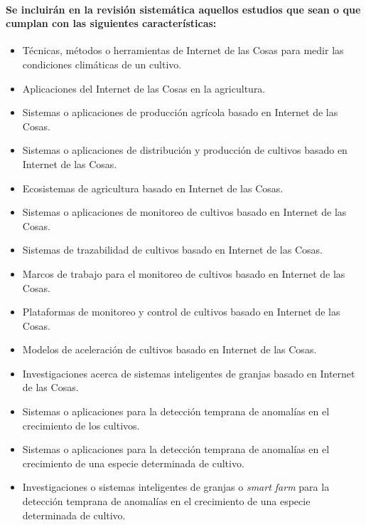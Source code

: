 \documentclass[10pt, twocolumn]{article}
\begin{document}
\paragraph{Se incluirán en la revisión sistemática aquellos estudios que sean o que cumplan con las siguientes características:}
\begin{itemize}
	\item{Técnicas, métodos o herramientas de Internet de las Cosas para medir las condiciones climáticas de un cultivo.}
	\item{Aplicaciones del Internet de las Cosas en la agricultura.}
	\item{Sistemas o aplicaciones de producción agrícola basado en Internet de las Cosas.}
	\item{Sistemas o aplicaciones de distribución y producción de cultivos basado en Internet de las Cosas.}
	\item{Ecosistemas de agricultura basado en Internet de las Cosas.}
	\item{Sistemas o aplicaciones de monitoreo de cultivos basado en Internet de las Cosas.}
	\item{Sistemas de trazabilidad de cultivos basado en Internet de las Cosas.}
	\item{Marcos de trabajo para el monitoreo de cultivos basado en Internet de las Cosas.}
	\item{Plataformas de monitoreo y control de cultivos basado en Internet de las Cosas.}
	\item{Modelos de aceleración de cultivos basado en Internet de las Cosas.}	
	\item{Investigaciones acerca de sistemas inteligentes de granjas basado en Internet de las Cosas.}
	\item{Sistemas o aplicaciones para la detección temprana de anomalías en el crecimiento de los cultivos.}
	\item{Sistemas o aplicaciones para la detección temprana de anomalías en el crecimiento de una especie determinada de cultivo.}
	\item{Investigaciones o sistemas inteligentes de granjas o \textit{smart farm} para la detección temprana de anomalías en el crecimiento de una especie determinada de cultivo.}
\end{itemize}
\end{document}
